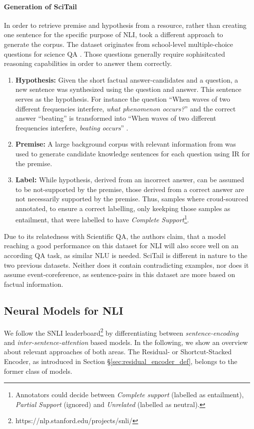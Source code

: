 \paragraph*{Generation of SciTail}
In order to retrieve premise and hypothesis from a resource, rather than creating one sentence for the specific purpose of \ac{NLI}, \cite{scitail} took a different approach to generate the corpus. The dataset originates from school-level multiple-choice questions for science \ac{QA} \citep{welbl2017crowdsourcing}. Those questions generally require sophisitcated reasoning capabilities in order to answer them correctly. 
\begin{enumerate}
\item \textbf{Hypothesis:} Given the short factual answer-candidates and a question, a new sentence was synthesized using the question and answer. This sentence serves as the hypothesis. For instance the question ``When waves of two different frequencies interfere, \textit{what phenomenon occurs?}'' and the correct answer ``beating'' is transformed into ``When waves of two different frequencies interfere, \textit{beating occurs}'' \citep{scitail}.
\item \textbf{Premise:} A large background corpus with relevant information from \cite{clark2016combining} was used to generate candidate knowledge sentences for each question using \ac{IR} for the premise.
\item \textbf{Label:} While hypothesis, derived from an incorrect answer, can be assumed to be not-supported by the premise, those derived from a correct answer are not necessarily supported by the premise. Thus, samples where croud-sourced annotated, to ensure a correct labelling, only keekping those samples as entailment, that were labelled to have \textit{Complete Support}\footnote{Annotators could decide between \textit{Complete support} (labelled as entailment), \textit{Partial Support} (ignored) and \textit{Unrelated} (labelled as neutral).}.
\end{enumerate}
Due to its relatedness with Scientific \ac{QA}, the authors claim, that a model reaching a good performance on this dataset for \ac{NLI} will also score well on an according \ac{QA} task, as similar \ac{NLU} is needed. SciTail is different in nature to the two previous datasets. Neither does it contain contradicting examples, nor does it assume event-coreference, as sentence-pairs in this dataset are more based on factual information. 


\subsection{Neural Models for NLI}\label{sec:models_snli}
We follow the \ac{SNLI} leaderboard\footnote{https://nlp.stanford.edu/projects/snli/} by differentiating between \textit{sentence-encoding} and \textit{inter-sentence-attention} based models. In the following, we show an overview about relevant approaches of both areas. The Residual- or Shortcut-Stacked Encoder, as introduced in Section §\ref{sec:residual_encoder_def}, belongs to the former class of models. 
